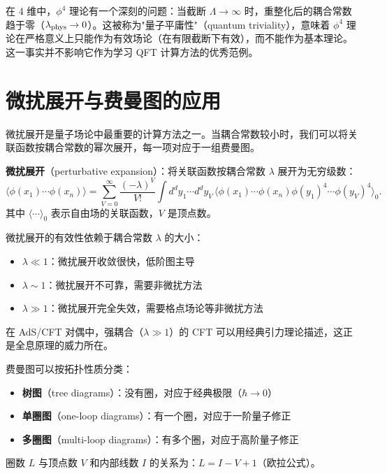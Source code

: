 \begin{remark}
在 4 维中，$\phi^4$ 理论有一个深刻的问题：当截断 $\Lambda \to \infty$ 时，重整化后的耦合常数趋于零（$\lambda_{\rm phys} \to 0$）。这被称为"量子平庸性"（quantum triviality），意味着 $\phi^4$ 理论在严格意义上只能作为有效场论（在有限截断下有效），而不能作为基本理论。这一事实并不影响它作为学习 QFT 计算方法的优秀范例。
\end{remark}

\section{微扰展开与费曼图的应用}

微扰展开是量子场论中最重要的计算方法之一。当耦合常数较小时，我们可以将关联函数按耦合常数的幂次展开，每一项对应于一组费曼图。

\begin{definition}[微扰展开]
\textbf{微扰展开}（perturbative expansion）：将关联函数按耦合常数 $\lambda$ 展开为无穷级数：
\begin{equation}
    \langle \phi(x_1) \cdots \phi(x_n) \rangle = \sum_{V=0}^{\infty} \frac{(-\lambda)^V}{V!} \int d^d y_1 \cdots d^d y_V \, \langle \phi(x_1) \cdots \phi(x_n) \phi(y_1)^4 \cdots \phi(y_V)^4 \rangle_0.
\end{equation}
其中 $\langle \cdots \rangle_0$ 表示自由场的关联函数，$V$ 是顶点数。
\end{definition}

\begin{note}[微扰展开的有效性]
微扰展开的有效性依赖于耦合常数 $\lambda$ 的大小：
\begin{itemize}
    \item $\lambda \ll 1$：微扰展开收敛很快，低阶图主导
    \item $\lambda \sim 1$：微扰展开不可靠，需要非微扰方法
    \item $\lambda \gg 1$：微扰展开完全失效，需要格点场论等非微扰方法
\end{itemize}
在 AdS/CFT 对偶中，强耦合（$\lambda \gg 1$）的 CFT 可以用经典引力理论描述，这正是全息原理的威力所在。
\end{note}

\begin{property}[费曼图的拓扑分类]
费曼图可以按拓扑性质分类：
\begin{itemize}
    \item \textbf{树图}（tree diagrams）：没有圈，对应于经典极限（$\hbar \to 0$）
    \item \textbf{单圈图}（one-loop diagrams）：有一个圈，对应于一阶量子修正
    \item \textbf{多圈图}（multi-loop diagrams）：有多个圈，对应于高阶量子修正
\end{itemize}
圈数 $L$ 与顶点数 $V$ 和内部线数 $I$ 的关系为：$L = I - V + 1$（欧拉公式）。
\end{property}

